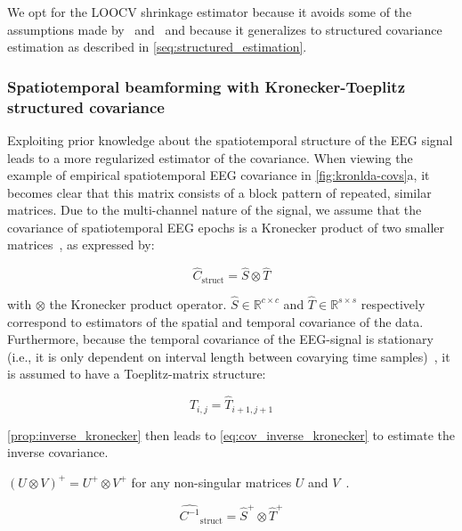 \begin{refsection}
	We opt for the LOOCV shrinkage estimator because it avoids some of the
	assumptions made by~\cite{Ledoit2004} and~\cite{Chen2010} and
	because it generalizes to structured covariance estimation as described in
	\autoref{seq:structured_estimation}.

	\subsubsection{Spatiotemporal beamforming with Kronecker-Toeplitz structured covariance}
	\label{seq:structured_estimation}
	Exploiting prior knowledge about the spatiotemporal structure of the EEG signal leads to a more regularized estimator of the covariance.
	When viewing the example of empirical spatiotemporal EEG covariance in
	\autoref{fig:kronlda-covs}a, it becomes clear that this matrix consists of a block pattern of repeated, similar matrices.
	Due to the multi-channel nature of the signal, we assume that the covariance of spatiotemporal EEG epochs is a Kronecker
	product of two smaller
	matrices~\cite{Munck1992,DeMunck1999,Huizenga2002}, as expressed
	by:

	\begin{equation}
		\hat{C}_\text{struct} = \hat{S} \otimes \hat{T}
		\label{eq:kronecker}
	\end{equation}

	with $\otimes$ the Kronecker product operator.
	$\hat{S} \in \mathbb{R}^{c\times c}$ and $\hat{T} \in \mathbb{R}^{s\times s}$ respectively correspond to estimators of the spatial and temporal covariance of the data.
	Furthermore, because the temporal covariance of the EEG-signal is
	stationary (i.e., it is only dependent on interval length between covarying
	time samples)~\cite{Bijma2003}, it is assumed to have a Toeplitz-matrix structure:

	\begin{equation}
		\hat{T}_{i,j} = \hat{T}_{i+1,j+1}
		\label{eq:toeplitz}
	\end{equation}

	\autoref{prop:inverse_kronecker} then leads to
	\autoref{eq:cov_inverse_kronecker} to estimate the inverse
	covariance.
	\begin{property}
		$(U \otimes V)^+ = U^+ \otimes V^+$ for any non-singular
		matrices $U$ and $V$~\cite{Langville2004}.
		\label{prop:inverse_kronecker}
	\end{property}

	\begin{equation}
		\widehat{C^{-1}}_\text{struct} = \hat{S}^+ \otimes \hat{T}^+
		\label{eq:cov_inverse_kronecker}
	\end{equation}


\end{refsection}
